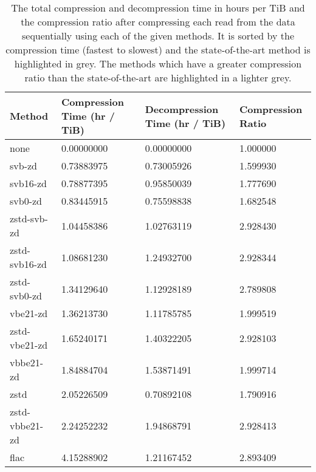 \begin{table}
    \caption{\label{tab:results-time-com} The total compression and
	decompression time in hours per TiB and the compression ratio after
	compressing each read from the data sequentially using each of the given
	methods. It is sorted by the compression time (fastest to slowest) and the state-of-the-art
	method is highlighted in grey. The methods which have a greater
	compression ratio than the state-of-the-art are highlighted in a lighter
	grey.}
	\begin{tabular}{|l|l|l|l|}
	    \hline
	    Method & Compression Time (hr / TiB) & Decompression Time (hr / TiB) & Compression Ratio \\
\hline
		none    & 0.00000000      & 0.00000000    &1.000000\\
             svb-zd     & 0.73883975      & 0.73005926    &1.599930\\
           svb16-zd     & 0.78877395      & 0.95850039    &1.777690\\
            svb0-zd     & 0.83445915      & 0.75598838    &1.682548\\
		\rowcolor{gray}
        zstd-svb-zd     & 1.04458386      & 1.02763119    &2.928430\\
      zstd-svb16-zd     & 1.08681230      & 1.24932700    &2.928344\\
       zstd-svb0-zd     & 1.34129640      & 1.12928189    &2.789808\\
           vbe21-zd     & 1.36213730      & 1.11785785    &1.999519\\
      zstd-vbe21-zd     & 1.65240171      & 1.40322205    &2.928103\\
          vbbe21-zd     & 1.84884704      & 1.53871491    &1.999714\\
               zstd     & 2.05226509      & 0.70892108    &1.790916\\
     zstd-vbbe21-zd     & 2.24252232      & 1.94868791    &2.928413\\
               flac     & 4.15288902      & 1.21167452    &2.893409\\

\end{tabular}
\end{table}
